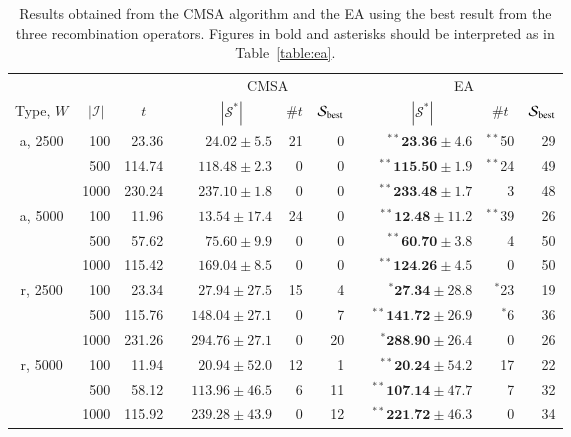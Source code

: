 \documentclass[authoryear]{elsarticle}
\begin{document}
\begin{table}[h!]
\centering
\caption{Results obtained from the CMSA algorithm and the EA using the best result from the three recombination operators. Figures in bold and asterisks should be interpreted as in Table~\ref{table:ea}.}
\footnotesize
\begin{threeparttable}
\begin{tabular}{crrcrrrcrrr}
	\toprule
	& & & & \multicolumn{3}{c}{CMSA} &\phantom{ab}& \multicolumn{3}{c}{EA}\\
	\cmidrule{5-7} \cmidrule{9-11}
	\multicolumn{1}{c}{Type, $W$} & \multicolumn{1}{c}{$|\mathcal{I}|$} & \multicolumn{1}{c}{$t$\tnote{$a$}} && \multicolumn{1}{c}{$|\mathcal{S}^*|$\tnote{$b$}} & \multicolumn{1}{c}{$\# t$\tnote{$c$}} & \multicolumn{1}{c}{$\mathcal{S}_{\textup{best}}$\tnote{$d$}} && \multicolumn{1}{c}{$|\mathcal{S}^*|$} & \multicolumn{1}{c}{$\# t$} & \multicolumn{1}{c}{$\mathcal{S}_{\textup{best}}$}\\
	\midrule
	a, 2500 & 100 & 23.36 && $24.02 \pm 5.5$ & 21 & 0 && $^{**}\textbf{23.36} \pm 4.6$ & $^{**}$50 & 29 \\
	& 500 & 114.74 && $118.48 \pm 2.3$ & 0 & 0 && $^{**}\textbf{115.50} \pm 1.9$ & $^{**}$24 & 49 \\
	& 1000 & 230.24 && $237.10 \pm 1.8$ & 0 & 0 && $^{**}\textbf{233.48} \pm 1.7$ & 3 & 48 \\
	\midrule
	a, 5000 & 100 & 11.96 && $13.54 \pm 17.4$ & 24 & 0 && $^{**}\textbf{12.48} \pm 11.2$ & $^{**}$39 & 26 \\
	& 500 & 57.62 && $75.60 \pm 9.9$ & 0 & 0 && $^{**}\textbf{60.70} \pm 3.8$ & 4 & 50 \\
	& 1000 & 115.42 && $169.04 \pm 8.5$ & 0 & 0 && $^{**}\textbf{124.26} \pm 4.5$ & 0 & 50 \\
	\midrule
	\midrule
	r, 2500 & 100 & 23.34 && $27.94 \pm 27.5$ & 15 & 4 && $^{*}\textbf{27.34} \pm 28.8$ & $^{*}$23 & 19 \\
	& 500 & 115.76 && $148.04 \pm 27.1$ & 0 & 7 && $^{**}\textbf{141.72} \pm 26.9$ & $^{*}$6 & 36 \\
	& 1000 & 231.26 && $294.76 \pm 27.1$ & 0 & 20 && $^{*}\textbf{288.90} \pm 26.4$ & 0 & 26 \\
	\midrule
	r, 5000 & 100 & 11.94 && $20.94 \pm 52.0$ & 12 & 1 && $^{**}\textbf{20.24} \pm 54.2$ & 17 & 22 \\
	& 500 & 58.12 && $113.96 \pm 46.5$ & 6 & 11 && $^{**}\textbf{107.14} \pm 47.7$ & 7 & 32 \\
	& 1000 & 115.92 && $239.28 \pm 43.9$ & 0 & 12 && $^{**}\textbf{221.72} \pm 46.3$ & 0 & 34 \\

\end{tabular}
\end{threeparttable}
\end{table}
\end{document}
